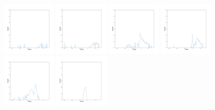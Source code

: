 \documentclass[12pt,prd]{article}
\begin{document}
\begin{figure}[h!]
\includegraphics[width=0.24\textwidth]{../figures/stars_near_zero_rahistgaiascan_l101_2_b58_4_ra212_7_dec55_2_npy_5.pdf}
\includegraphics[width=0.24\textwidth]{../figures/stars_near_zero_rahistgaiascan_l101_2_b58_4_ra212_7_dec55_2_npy_6.pdf}
\includegraphics[width=0.24\textwidth]{../figures/stars_near_zero_rahistgaiascan_l101_2_b58_4_ra212_7_dec55_2_npy_7.pdf}
\includegraphics[width=0.24\textwidth]{../figures/stars_near_zero_rahistgaiascan_l101_2_b58_4_ra212_7_dec55_2_npy_8.pdf}
\includegraphics[width=0.24\textwidth]{../figures/stars_near_zero_rahistgaiascan_l101_2_b58_4_ra212_7_dec55_2_npy_9.pdf}
\includegraphics[width=0.24\textwidth]{../figures/stars_near_zero_rahistgaiascan_l101_2_b58_4_ra212_7_dec55_2_npy_10.pdf}

\end{figure}
\end{document}
